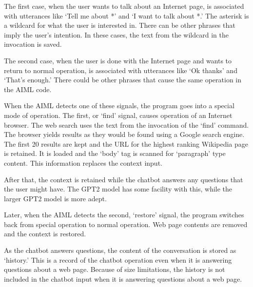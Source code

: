 The first case, when the user wants to talk about an Internet page, is associated with utterances like `Tell me about *' and `I want to talk about *.' The asterisk is a wildcard for what the user is interested in. There can be other phrases that imply the user's intention. In these cases, the text from the wildcard in the invocation is saved.

The second case, when the user is done with the Internet page and wants to return to normal operation, is associated with utterances like `Ok thanks' and `That's enough.' 
There could be other phrases that cause the same operation in the AIML code.

When the AIML detects one of these signals, the program goes into a special mode of operation. The first, or `find' signal, causes operation of an Internet browser. The web search uses the text from the invocation of the `find' command. The browser yields results as they would be found using a Google search engine. The first 20 results are kept and the URL for the highest ranking Wikipedia page is retained. It is loaded and the `body' tag is scanned for `paragraph' type content. This information replaces the context input. 

After that, the context is retained while the chatbot answers any questions that the user might have. The GPT2 model has some facility with this, while the larger GPT2 model is more adept.

Later, when the AIML detects the second, `restore' signal, the program switches back from special operation to normal operation. Web page contents are removed and the context is restored. %

As the chatbot answers questions, the content of the conversation is stored as `history.' %
This is a record of the chatbot operation even when it is answering questions about a web page. %
Because of size limitations, the history is not included in the chatbot input when it is answering questions about a web page. %


